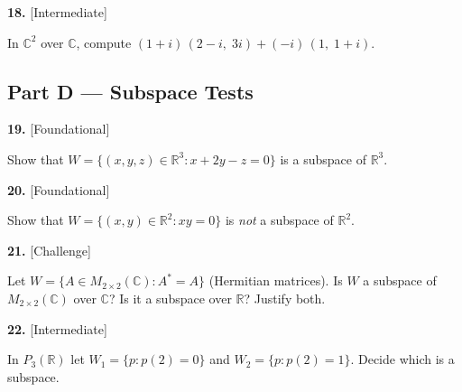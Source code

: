\documentclass[11pt]{article}
\begin{document}
\begin{minipage}{\linewidth}\textbf{18.} \hfill{\scriptsize\color{ink}[Intermediate]}\par\nopagebreak In $\mathbb{C}^{2}$ over $\mathbb{C}$, compute $(1+i)\,(2-i,\;3i)+(-i)\,(1,\;1+i)$.
\vspace{3.4cm}\end{minipage}\par\vspace{4pt}
\subsection*{\normalsize\color{ink} Part D --- Subspace Tests}
\begin{minipage}{\linewidth}\textbf{19.} \hfill{\scriptsize\color{ink}[Foundational]}\par\nopagebreak Show that $W=\{(x,y,z)\in\mathbb{R}^{3}: x+2y-z=0\}$ is a subspace of $\mathbb{R}^{3}$.
\vspace{4.4cm}\end{minipage}\par\vspace{4pt}
\begin{minipage}{\linewidth}\textbf{20.} \hfill{\scriptsize\color{ink}[Foundational]}\par\nopagebreak Show that $W=\{(x,y)\in\mathbb{R}^{2}: xy=0\}$ is \emph{not} a subspace of $\mathbb{R}^{2}$.
\vspace{3.4cm}\end{minipage}\par\vspace{4pt}
\begin{minipage}{\linewidth}\textbf{21.} \hfill{\scriptsize\color{ink}[Challenge]}\par\nopagebreak Let $W=\{A\in M_{2\times2}(\mathbb{C}):A^{*}=A\}$ (Hermitian matrices). Is $W$ a subspace of $M_{2\times2}(\mathbb{C})$ over $\mathbb{C}$? Is it a subspace over $\mathbb{R}$? Justify both.
\vspace{5.0cm}\end{minipage}\par\vspace{4pt}
\begin{minipage}{\linewidth}\textbf{22.} \hfill{\scriptsize\color{ink}[Intermediate]}\par\nopagebreak In $P_{3}(\mathbb{R})$ let $W_1=\{p: p(2)=0\}$ and $W_2=\{p: p(2)=1\}$. Decide which is a subspace.
\vspace{4.4cm}\end{minipage}\par\vspace{4pt}
\end{document}
